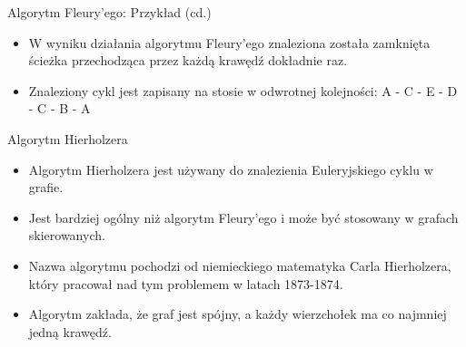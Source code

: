 \documentclass[polish,envcountsect,10pt]{beamer}
\begin{document}
\begin{frame}{Algorytm Fleury'ego: Przykład (cd.)}
    \begin{itemize}
        \item W wyniku działania algorytmu Fleury'ego znaleziona została zamknięta ścieżka przechodząca przez każdą krawędź dokładnie raz.
        \item Znaleziony cykl jest zapisany na stosie w odwrotnej kolejności: A - C - E - D - C - B - A
    \end{itemize}
    \begin{center}
    \end{center}
\end{frame}


\begin{frame}{Algorytm Hierholzera}
    \begin{itemize}
        \item Algorytm Hierholzera jest używany do znalezienia Euleryjskiego cyklu w grafie.
        \item Jest bardziej ogólny niż algorytm Fleury'ego i może być stosowany w grafach skierowanych.
        \item Nazwa algorytmu pochodzi od niemieckiego matematyka Carla Hierholzera, który pracował nad tym problemem w latach 1873-1874.
        \item Algorytm zakłada, że graf jest spójny, a każdy wierzchołek ma co najmniej jedną krawędź.
    \end{itemize}
\end{frame}
    
\end{document}
